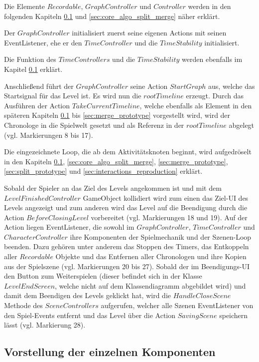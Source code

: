 Die Elemente $Recordable$, $GraphController$ und $Controller$ werden in den folgenden Kapiteln \ref{sec:components} und \ref{sec:core_algo_split_merge} näher erklärt.

Der $GraphController$ initialisiert zuerst seine eigenen Actions mit seinen EventListener, ehe er den $TimeController$ und die $TimeStability$ initialisiert. 

Die Funktion des $TimeControllers$ und die $TimeStability$ werden ebenfalls im Kapitel \ref{sec:components} erklärt.

Anschließend führt der $GraphController$ seine Action $StartGraph$ aus, welche das Startsignal für das Level ist. Es wird nun die $rootTimeline$ erzeugt. Durch das Ausführen der Action $TakeCurrentTimeline$, welche ebenfalls als Element in den späteren Kapiteln \ref{sec:components} bis \ref{sec:merge_prototype} vorgestellt wird, wird der Chronologe in die Spielwelt gesetzt und als Referenz in der $rootTimeline$ abgelegt (vgl. Markierungen 8 bis 17).

Die eingezeichnete Loop, die ab dem Aktivitätsknoten  beginnt, wird aufgedröselt in den Kapiteln \ref{sec:components}, \ref{sec:core_algo_split_merge}, \ref{sec:merge_prototype}, \ref{sec:split_prototype} und \ref{sec:interactions_reproduction} erklärt.

Sobald der Spieler an das Ziel des Levels angekommen ist und mit dem \\ $LevelFinishedController$ GameObject kollidiert wird zum einen das Ziel-\ac{UI} des Levels angezeigt und zum anderen wird das Level auf die Beendigung durch die Action $BeforeClosingLevel$ vorbereitet (vgl. Markierungen 18 und 19). Auf der Action liegen EventListener, die sowohl im $GraphController$, $TimeController$ und $CharacterController$ ihre Komponenten der Spielmechanik und der Szenen-Loop beenden. Dazu gehören unter anderem das Stoppen des Timers, das Entkoppeln aller $Recordable$ Objekte und das Entfernen aller Chronologen und ihre Kopien aus der Spielszene (vgl. Markierungen 20 bis 27). Sobald der im Beendigungs-\ac{UI} den Button zum Weiterspielen (dieser befindet sich in der Klasse $LevelEndScreen$, welche nicht auf dem Klassendiagramm abgebildet wird) und damit dem Beendigen des Levels geklickt hat, wird die $HandleCloseScene$ Methode des $SceneControllers$ aufgerufen, welcher alle Szenen EventListener von den Spiel-Events entfernt und das Level über die Action $SavingScene$ speichern lässt (vgl. Markierung 28).

\subsection{Vorstellung der einzelnen Komponenten}\label{sec:components}
